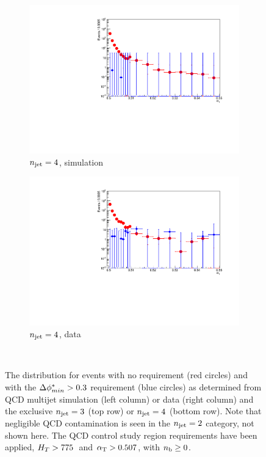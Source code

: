 \begin{figure}[h!]
\begin{subfigure}[b]{0.46\textwidth}
    \includegraphics[width=\textwidth]{Figs/dphi/chris2/qcd_mc/dphi_incl/v2/dphi_eq4j_ge0b_775}
    \caption{$n_{\text{jet}} = 4$, simulation}
    \label{fig:dphi_acceptance_sim_4j}
  \end{subfigure}
  \begin{subfigure}[b]{0.46\textwidth}
    \includegraphics[width=\textwidth]{Figs/dphi/chris2/data/dphi_incl/v2/dphi_eq4j_ge0b_775}
    \caption{$n_{\text{jet}} = 4$, data}
    \label{fig:dphi_acceptance_data_4j}
  \end{subfigure}\\
  \caption{The \alphat distribution for events with no \mindphistar
    requirement (red circles) and with the $\Delta \phi^*_{min} > 0.3$
    requirement (blue circles) as determined from QCD multijet
    simulation (left column) or data (right column) and the exclusive
    $n_{\text{jet}} =3$
    (top row) or $n_{\text{jet}} = 4$ (bottom row). Note that negligible QCD contamination
    is seen in the $n_{\text{jet}} = 2$ category, not shown here. The QCD control study
    region requirements have been applied, $H_T > 775$~\gev and $\alpha_{\text{T}} >
    0.507$, with $n_{\text{b}} \geq 0$.}
    \label{fig:data_pred_dphistar_eff}
\end{figure}
